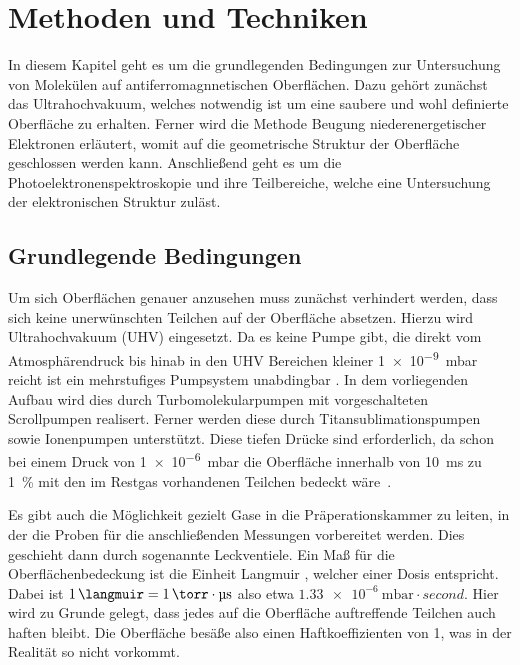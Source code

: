 \chapter{Methoden und Techniken} \label{cha:Methoden}
    In diesem Kapitel geht es um die grundlegenden Bedingungen zur Untersuchung von Molekülen auf antiferromagnnetischen Oberflächen.
    Dazu gehört zunächst das Ultrahochvakuum, welches notwendig ist um eine saubere und wohl definierte Oberfläche zu erhalten.
    Ferner wird die Methode Beugung niederenergetischer Elektronen erläutert, womit auf die geometrische Struktur der Oberfläche geschlossen werden kann.
    Anschließend geht es um die Photoelektronenspektroskopie und ihre Teilbereiche, welche eine Untersuchung der elektronischen Struktur zuläst.

    \section{Grundlegende Bedingungen} \label{sec:Grundlagen}
        Um sich Oberflächen genauer anzusehen muss zunächst verhindert werden, dass sich keine unerwünschten Teilchen auf der Oberfläche absetzen.
        Hierzu wird Ultrahochvakuum (UHV) eingesetzt.
        Da es keine Pumpe gibt, die direkt vom Atmosphärendruck bis hinab in den UHV Bereichen kleiner \SI{1e-9}{\milli\bar} reicht ist ein mehrstufiges Pumpsystem unabdingbar \cite{Henzler}.
        In dem vorliegenden Aufbau wird dies durch Turbomolekularpumpen mit vorgeschalteten Scrollpumpen realisert.
        Ferner werden diese durch Titansublimationspumpen sowie Ionenpumpen unterstützt.
        Diese tiefen Drücke sind erforderlich, da schon bei einem Druck von \SI{1e-6}{\milli\bar} die Oberfläche innerhalb von \SI{10}{\milli\second} zu \SI{1}{\percent} mit den im Restgas vorhandenen Teilchen bedeckt wäre~\cite{Henzler}.

        Es gibt auch die Möglichkeit gezielt Gase in die Präperationskammer zu leiten, in der die Proben für die anschließenden Messungen vorbereitet werden.
        Dies geschieht dann durch sogenannte Leckventiele.
        Ein Maß für die Oberflächenbedeckung ist die Einheit Langmuir \si{\langmuir}, welcher einer Dosis entspricht.
        Dabei ist $\SI{1}{\langmuir} = \SI{1}{\torr} \cdot \si{\micro\second}$ also etwa $\SI{1.33e-6}{\milli\bar} \cdot \si{second}$.
        Hier wird zu Grunde gelegt, dass jedes auf die Oberfläche auftreffende Teilchen auch haften bleibt. 
        Die Oberfläche besäße also einen Haftkoeffizienten von \num{1}, was in der Realität so nicht vorkommt.

